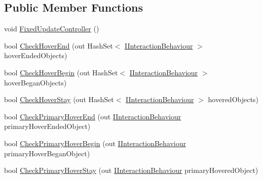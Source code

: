 \subsection*{Public Member Functions}
\begin{DoxyCompactItemize}
\item 
void \mbox{\hyperlink{interface_leap_1_1_unity_1_1_interaction_1_1_i_internal_interaction_controller_a9977430f30f8238a45ea091ae1c91ede}{Fixed\+Update\+Controller}} ()
\item 
bool \mbox{\hyperlink{interface_leap_1_1_unity_1_1_interaction_1_1_i_internal_interaction_controller_a4bc12861f87748fe954601d28b6188ee}{Check\+Hover\+End}} (out Hash\+Set$<$ \mbox{\hyperlink{interface_leap_1_1_unity_1_1_interaction_1_1_i_interaction_behaviour}{I\+Interaction\+Behaviour}} $>$ hover\+Ended\+Objects)
\item 
bool \mbox{\hyperlink{interface_leap_1_1_unity_1_1_interaction_1_1_i_internal_interaction_controller_ab4e300cb612b32c697ac121a565258f9}{Check\+Hover\+Begin}} (out Hash\+Set$<$ \mbox{\hyperlink{interface_leap_1_1_unity_1_1_interaction_1_1_i_interaction_behaviour}{I\+Interaction\+Behaviour}} $>$ hover\+Began\+Objects)
\item 
bool \mbox{\hyperlink{interface_leap_1_1_unity_1_1_interaction_1_1_i_internal_interaction_controller_a44924ff0e064e530ada19ca013ed1dc1}{Check\+Hover\+Stay}} (out Hash\+Set$<$ \mbox{\hyperlink{interface_leap_1_1_unity_1_1_interaction_1_1_i_interaction_behaviour}{I\+Interaction\+Behaviour}} $>$ hovered\+Objects)
\item 
bool \mbox{\hyperlink{interface_leap_1_1_unity_1_1_interaction_1_1_i_internal_interaction_controller_a425e6a510b3b344f063fcb97c9f80cf8}{Check\+Primary\+Hover\+End}} (out \mbox{\hyperlink{interface_leap_1_1_unity_1_1_interaction_1_1_i_interaction_behaviour}{I\+Interaction\+Behaviour}} primary\+Hover\+Ended\+Object)
\item 
bool \mbox{\hyperlink{interface_leap_1_1_unity_1_1_interaction_1_1_i_internal_interaction_controller_a02dbe57632c743509528450588d5ecf2}{Check\+Primary\+Hover\+Begin}} (out \mbox{\hyperlink{interface_leap_1_1_unity_1_1_interaction_1_1_i_interaction_behaviour}{I\+Interaction\+Behaviour}} primary\+Hover\+Began\+Object)
\item 
bool \mbox{\hyperlink{interface_leap_1_1_unity_1_1_interaction_1_1_i_internal_interaction_controller_a10360e7b2f4942549c20a72cf17c7b07}{Check\+Primary\+Hover\+Stay}} (out \mbox{\hyperlink{interface_leap_1_1_unity_1_1_interaction_1_1_i_interaction_behaviour}{I\+Interaction\+Behaviour}} primary\+Hovered\+Object)

\end{DoxyCompactItemize}
